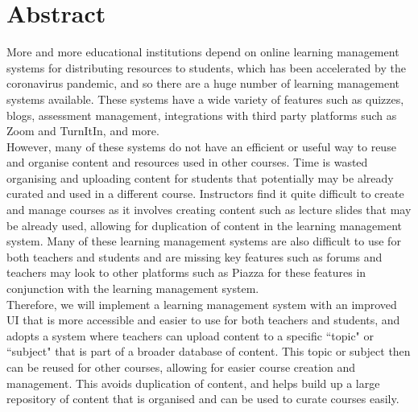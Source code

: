 \chapter*{Abstract}\label{abstract}
More and more educational institutions depend on online learning management systems for distributing resources to students, which has been accelerated by the coronavirus pandemic, and so there are a huge number of learning management systems available. These systems have a wide variety of features such as quizzes, blogs, assessment management, integrations with third party platforms such as Zoom and TurnItIn, and more. \\

However, many of these systems do not have an efficient or useful way to reuse and organise content and resources used in other courses. Time is wasted organising and uploading content for students that potentially may be already curated and used in a different course. Instructors find it quite difficult to create and manage courses as it involves creating content such as lecture slides that may be already used, allowing for duplication of content in the learning management system. Many of these learning management systems are also difficult to use for both teachers and students and are missing key features such as forums and teachers may look to other platforms such as Piazza for these features in conjunction with the learning management system. \\

Therefore, we will implement a learning management system with an improved UI that is more accessible and easier to use for both teachers and students, and adopts a system where teachers can upload content to a specific ``topic" or ``subject" that is part of a broader database of content. This topic or subject then can be reused for other courses, allowing for easier course creation and management. This avoids duplication of content, and helps build up a large repository of content that is organised and can be used to curate courses easily.